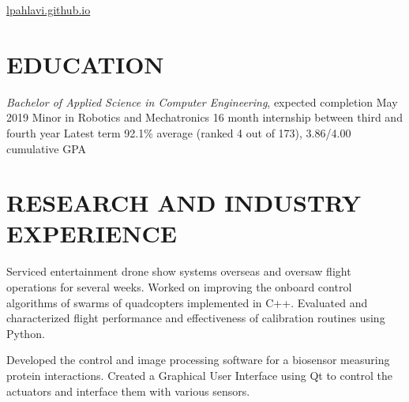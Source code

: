 \documentclass{ResumeTemplate}
\begin{document}
	
	
	{\href{https://lpahlavi.github.io}{lpahlavi.github.io}}
	
	\section{EDUCATION}
	\workitemsfour
	{{\textit{Bachelor of Applied Science in Computer Engineering}, expected completion May 2019}}
	{Minor in Robotics and Mechatronics}
	{16 month internship between third and fourth year}
	{Latest term 92.1\% average (ranked 4 out of 173), 3.86/4.00 cumulative GPA}
	
	\section{RESEARCH AND INDUSTRY EXPERIENCE}
	

	\workitemsthree
	{Serviced entertainment drone show systems overseas and oversaw flight operations for several weeks.}
	{Worked on improving the onboard control algorithms of swarms of quadcopters implemented in C++.}
	{Evaluated and characterized flight performance and effectiveness of calibration routines using Python.}
	
	
	\workitemstwo
	{Developed the control and image processing software for a biosensor measuring protein interactions.}
	{Created a Graphical User Interface using Qt to control the actuators and interface them with various sensors.}
	
\end{document}
